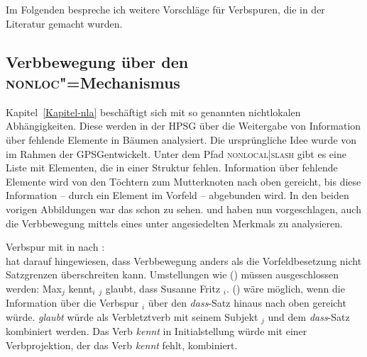 Im Folgenden bespreche ich weitere Vorschläge für Verbspuren, die in der Literatur gemacht wurden.


\subsection{Verbbewegung über den \texorpdfstring{\textsc{nonloc}}{NONLOC}"=Mechanismus}

Kapitel~\ref{Kapitel-nla} beschäftigt sich mit so genannten nichtlokalen Abhängigkeiten. Diese
werden in der HPSG über die Weitergabe von Information über fehlende Elemente in Bäumen
analysiert. Die ursprüngliche Idee wurde von \citet{Gazdar81a} im Rahmen der GPSG\indexgpsg entwickelt. Unter dem Pfad
\textsc{nonlocal|slash} gibt es eine Liste mit Elementen, die in einer Struktur fehlen. Information
über fehlende Elemente wird von den Töchtern zum Mutterknoten nach oben gereicht, bis diese
Information -- \zB durch ein Element im Vorfeld -- abgebunden wird. In den beiden vorigen
Abbildungen war das schon zu sehen. \citet[Abschnitt~4.7]{KW91a} und \textcites[Abschnitt~2.2.4.2]{Kiss95a}[Abschnitt~5.4.2]{Kiss95b} haben nun vorgeschlagen, auch
die Verbbewegung mittels eines unter \nonlocal angesiedelten Merkmals zu analysieren.

\eas
\label{le-verbspur-DSL-in-NONLOC}%
Verbspur mit \dsl in \nonloc nach \textcites[72]{Kiss95a}[230]{Kiss95b}:\\
\zs
\citet[125]{Frank94b} hat darauf hingewiesen, dass Verbbewegung anders als \zB die Vorfeldbesetzung
nicht Satzgrenzen überschreiten kann. Umstellungen wie () müssen ausgeschlossen werden:
\ea
Max$_j$ kennt$_i$ \trace$_j$ glaubt, dass Susanne Fritz \trace$_i$.
\z
() wäre möglich, wenn die Information über die Verbspur \trace$_i$ über den \emph{dass}-Satz
hinaus nach oben gereicht würde. \emph{glaubt} würde als Verbletztverb mit seinem Subjekt \trace$_j$
und dem \emph{dass}-Satz kombiniert werden. Das Verb \emph{kennt} in Initialstellung würde mit einer
Verbprojektion, der das Verb \emph{kennt} fehlt, kombiniert. 

